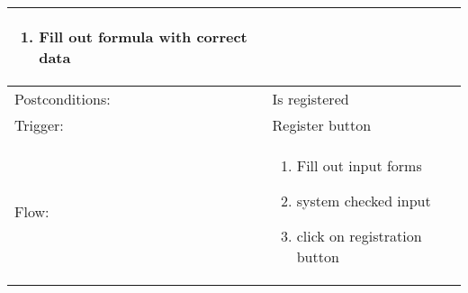 \begin{longtable}{| p{3.5cm} | p{9cm} |}
\begin{enumerate}
\item Fill out formula with correct data 
\end{enumerate}\\
\hline
Postconditions: & Is registered \\
\hline
Trigger: & Register button \\
\hline
Flow: &\mbox{}\par\vspace{-\baselineskip}
\begin{enumerate}
\item Fill out input forms
\item system checked input
\item click on registration button
\end{enumerate}\\
\hline
\end{longtable}

